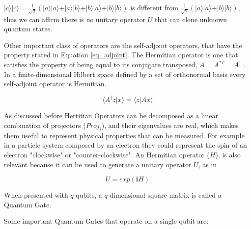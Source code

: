 $\vert c \rangle\vert c \rangle = \frac{1}{\sqrt{2}}( \vert a \rangle\vert a \rangle + \vert a \rangle\vert b \rangle+ \vert b \rangle\vert a \rangle+ \vert b \rangle\vert b \rangle)$ is different from $\frac{1}{\sqrt{2}}( \vert a \rangle\vert a \rangle + \vert b \rangle\vert b \rangle)$, thus we can affirm there is no unitary operator $U$ that can clone unknown quantum states\cite{Rieffel2011}.


Other important class of operators are the self-adjoint operators, that have the property stated in Equation \ref{eq_adjoint}. The Hermitian operator is one that satisfies the property of being equal to its conjugate transposed, $A = A^{*T} =A^\dagger$ .  In a finite-dimensional Hilbert space defined by a set of orthonormal basis every self-adjoint operator is Hermitian\cite{VanRijsbergen2004}. 

\begin{equation}
\label{eq_adjoint}
\langle A^{\dagger}z\vert x\rangle=\langle z\vert Ax\rangle
\end{equation}

As discussed before Hertitian Operators can be decomposed as a linear combination of projectors ($Proj_{i}$), and their eigenvalues are real, which makes them useful to represent physical properties that can be measured. For example in a particle system composed by an electron they could represent the spin of an electron "clockwise" or "counter-clockwise". An Hermitian operator ($H$), is also relevant because it can be used to generate a unitary operator $U$, as in 

\begin{equation}
\label{eq:hermitiantounitary}
U = exp ( \mathbf{i}H)
\end{equation}


When presented with $q$ qubits, a $q$-dimensional square matrix is called a Quantum Gate.



Some important Quantum Gates that operate on a single qubit are:

